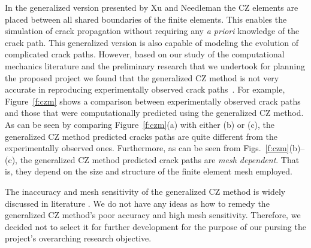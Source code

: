 \documentclass[10pt,letterpaper]{article}
\begin{document}
    In the generalized version presented by Xu and Needleman the CZ elements are placed between all shared boundaries of the finite elements. This enables the simulation of crack propagation without requiring any \textit{a priori} knowledge of the crack path. This  generalized version is also capable of modeling the evolution of complicated crack paths. However, based on our study of the computational mechanics literature and the preliminary research that we undertook for planning the proposed project we found that the  generalized  CZ method is not very accurate in reproducing experimentally observed crack paths~\cite{tijssens2000numerical,de2003numerical,de2004computational}. For example,  Figure~\ref{f:czm} shows a comparison between  experimentally observed crack paths and those that were computationally predicted using the generalized CZ method. As can be seen by comparing Figure~\ref{f:czm}(a) with either (b) or (c),  the generalized CZ method predicted cracks paths are quite different from the experimentally observed ones.  Furthermore, as can be seen from Figs.~\ref{f:czm}(b)--(c), the generalized CZ method predicted crack paths are \textit{mesh dependent}. That is, they depend on the size and structure of the finite element mesh employed.

    The inaccuracy and  mesh sensitivity of the generalized CZ method is widely discussed in literature \cite{de2003numerical,de2004computational,tijssens2000numerical,song2008comparative}.      We do not have any ideas as how to remedy the generalized CZ method's poor accuracy and high mesh sensitivity. Therefore, we decided not to select it for further development for the purpose of our pursing the project's overarching research objective.

\end{document}
